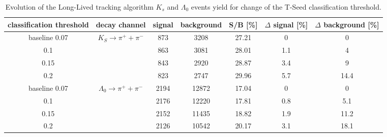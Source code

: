 \begin{table}[h]
\caption{Evolution of the Long-Lived tracking algorithm $K_s$ and $\Lambda_0$ events yield for change of the T-Seed classification threshold.}
\hspace*{-2.5cm}
\begin{tabular}{|c|c|c|c|c|c|c|}
\hline
classification threshold & decay channel                                              & signal & background & S/B [\%] & $\Delta$ signal [\%] & $\Delta$ background [\%] \\ \hline
baseline 0.07            & \multirow{4}{*}{$K_S \rightarrow \pi^{+} + \pi^{-}$}       & 873    & 3208       & 27.21    & 0                    & 0                        \\ \cline{1-1} \cline{3-7} 
0.1                      &                                                            & 863    & 3081       & 28.01    & 1.1                  & 4                        \\ \cline{1-1} \cline{3-7} 
0.15                     &                                                            & 843    & 2920       & 28.87    & 3.4                  & 9                        \\ \cline{1-1} \cline{3-7} 
0.2                      &                                                            & 823    & 2747       & 29.96    & 5.7                  & 14.4                     \\ \hline
baseline 0.07            & \multirow{4}{*}{$\Lambda_0 \rightarrow \pi^{+} + \pi^{-}$} & 2194   & 12872      & 17.04    & 0                    & 0                        \\ \cline{1-1} \cline{3-7} 
0.1                      &                                                            & 2176   & 12220      & 17.81    & 0.8                  & 5.1                      \\ \cline{1-1} \cline{3-7} 
0.15                     &                                                            & 2152   & 11435      & 18.82    & 1.9                  & 11.2                     \\ \cline{1-1} \cline{3-7} 
0.2                      &                                                            & 2126   & 10542      & 20.17    & 3.1                  & 18.1                     \\ \hline
\end{tabular}
\label{tab:finetuning}
\end{table}


